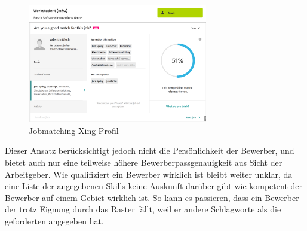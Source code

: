 \begin{figure}[htb]
 \centering
 \includegraphics[width=0.7\textwidth,angle=0]{abb/xing_jobmatching}
 \caption[Beschreibung]{Jobmatching Xing-Profil}
\label{fig:Beschreibung}
\end{figure}

Dieser Ansatz berücksichtigt jedoch nicht die Persönlichkeit der Bewerber, und bietet auch nur eine teilweise höhere Bewerberpassgenauigkeit aus Sicht der Arbeitgeber. Wie qualifiziert ein Bewerber wirklich ist bleibt weiter unklar, da eine Liste der angegebenen Skills keine Auskunft darüber gibt wie kompetent der Bewerber auf einem Gebiet wirklich ist. So kann es passieren, dass ein Bewerber der trotz Eignung durch das Raster fällt, weil er andere Schlagworte als die geforderten angegeben hat.





